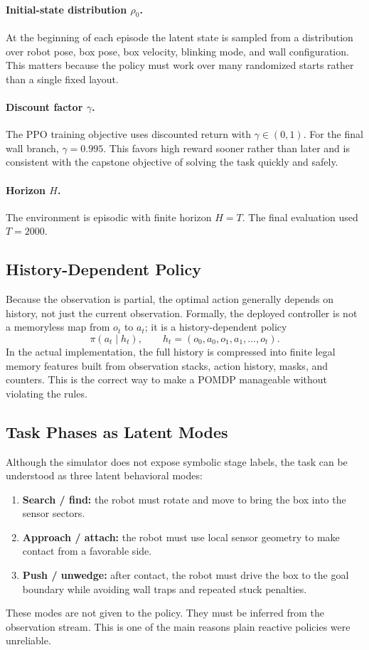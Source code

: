 \documentclass[11pt]{article}
\begin{document}
\paragraph{Initial-state distribution \(\rho_0\).}
At the beginning of each episode the latent state is sampled from a distribution over
robot pose, box pose, box velocity, blinking mode, and wall configuration. This matters
because the policy must work over many randomized starts rather than a single fixed
layout.

\paragraph{Discount factor \(\gamma\).}
The PPO training objective uses discounted return with \(\gamma\in(0,1)\). For the final
wall branch, \(\gamma=0.995\). This favors high reward sooner rather than later and is
consistent with the capstone objective of solving the task quickly and safely.

\paragraph{Horizon \(H\).}
The environment is episodic with finite horizon \(H=T\). The final evaluation used
\(T=2000\).

\subsection{History-Dependent Policy}

Because the observation is partial, the optimal action generally depends on history, not
just the current observation. Formally, the deployed controller is not a memoryless map
from \(o_t\) to \(a_t\); it is a history-dependent policy
\[
  \pi(a_t\mid h_t),
  \qquad
  h_t=(o_0,a_0,o_1,a_1,\dots,o_t).
\]
In the actual implementation, the full history is compressed into finite legal memory
features built from observation stacks, action history, masks, and counters. This is the
correct way to make a POMDP manageable without violating the rules.

\subsection{Task Phases as Latent Modes}

Although the simulator does not expose symbolic stage labels, the task can be understood
as three latent behavioral modes:
\begin{enumerate}[leftmargin=1.5em]
  \item \textbf{Search / find:} the robot must rotate and move to bring the box into the
  sensor sectors.
  \item \textbf{Approach / attach:} the robot must use local sensor geometry to make
  contact from a favorable side.
  \item \textbf{Push / unwedge:} after contact, the robot must drive the box to the goal
  boundary while avoiding wall traps and repeated stuck penalties.
\end{enumerate}
These modes are not given to the policy. They must be inferred from the observation
stream. This is one of the main reasons plain reactive policies were unreliable.
\end{document}
